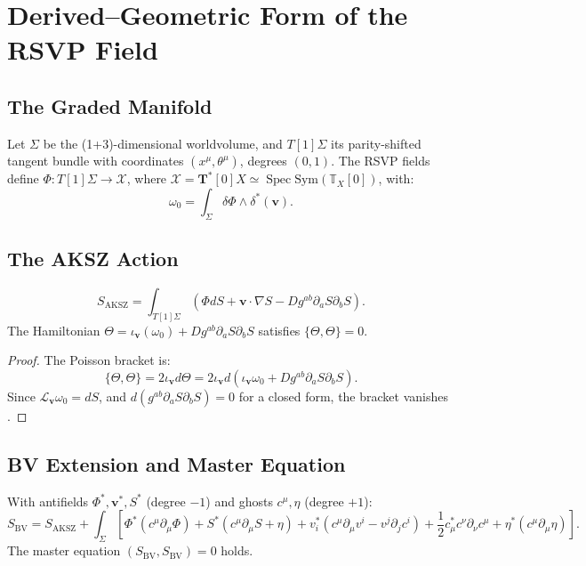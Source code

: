 \documentclass[12pt]{article}
\begin{document}
\appendix
\section{Derived–Geometric Form of the RSVP Field}
\label{app:derived}

\subsection{The Graded Manifold}

Let \(\Sigma\) be the (1+3)-dimensional worldvolume, and \(T[1]\Sigma\) its parity-shifted tangent bundle with coordinates \((x^\mu, \theta^\mu)\), degrees \((0,1)\). The RSVP fields define \(\Phi: T[1]\Sigma \to \mathcal{X}\), where \(\mathcal{X} = \mathbf{T}^*[0]X \simeq \operatorname{Spec} \mathrm{Sym}(\mathbb{T}_X[0])\), with:
\[
\omega_0 = \int_\Sigma \delta \Phi \wedge \delta^* (\mathbf{v}).
\]

\subsection{The AKSZ Action}

\[
S_{\mathrm{AKSZ}} = \int_{T[1]\Sigma} \left( \Phi dS + \mathbf{v} \cdot \nabla S - D g^{ab} \partial_a S \partial_b S \right).
\]
The Hamiltonian \(\Theta = \iota_{\mathbf{v}}(\omega_0) + D g^{ab} \partial_a S \partial_b S\) satisfies \(\{\Theta, \Theta\} = 0\).

\begin{proof}
The Poisson bracket is:
\[
\{\Theta, \Theta\} = 2 \iota_{\mathbf{v}} d\Theta = 2 \iota_{\mathbf{v}} d (\iota_{\mathbf{v}} \omega_0 + D g^{ab} \partial_a S \partial_b S).
\]
Since \(\mathcal{L}_{\mathbf{v}} \omega_0 = dS\), and \(d (g^{ab} \partial_a S \partial_b S) = 0\) for a closed form, the bracket vanishes \citep{Alexandrov1997}.
\end{proof}

\subsection{BV Extension and Master Equation}

With antifields \(\Phi^*, \mathbf{v}^*, S^*\) (degree \(-1\)) and ghosts \(c^\mu, \eta\) (degree \(+1\)):
\[
S_{\mathrm{BV}} = S_{\mathrm{AKSZ}} + \int_\Sigma \left[ \Phi^* (c^\mu \partial_\mu \Phi) + S^* (c^\mu \partial_\mu S + \eta) + v_i^* (c^\mu \partial_\mu v^i - v^j \partial_j c^i) + \frac{1}{2} c_\mu^* c^\nu \partial_\nu c^\mu + \eta^* (c^\mu \partial_\mu \eta) \right].
\]
The master equation \((S_{\mathrm{BV}}, S_{\mathrm{BV}}) = 0\) holds.
\end{document}
